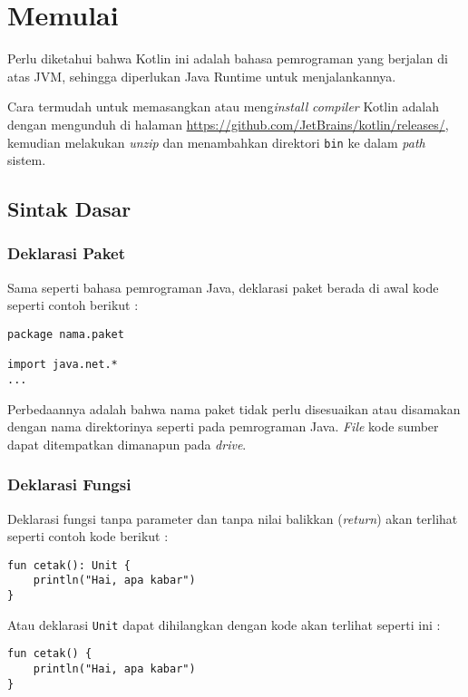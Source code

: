 \chapter{Memulai} 

Perlu diketahui bahwa Kotlin ini adalah bahasa pemrograman yang berjalan di atas JVM, sehingga diperlukan Java Runtime untuk menjalankannya.

Cara termudah untuk memasangkan atau meng\textit{install} \textit{compiler} Kotlin adalah dengan mengunduh di halaman \url{https://github.com/JetBrains/kotlin/releases/}, kemudian melakukan \textit{unzip} dan menambahkan direktori \texttt{bin} ke dalam \textit{path} sistem.

\section{Sintak Dasar}

\subsection{Deklarasi Paket}

Sama seperti bahasa pemrograman Java, deklarasi paket berada di awal kode seperti contoh berikut :

\begin{lstlisting}
package nama.paket

import java.net.*
...
\end{lstlisting}

Perbedaannya adalah bahwa nama paket tidak perlu disesuaikan atau disamakan dengan nama direktorinya seperti pada pemrograman Java. \textit{File} kode sumber dapat ditempatkan dimanapun pada \textit{drive}.

\subsection{Deklarasi Fungsi}

Deklarasi fungsi tanpa parameter dan tanpa nilai balikkan (\textit{return}) akan terlihat seperti contoh kode berikut :

\begin{lstlisting}
fun cetak(): Unit {
	println("Hai, apa kabar")
}
\end{lstlisting}

Atau deklarasi \texttt{Unit} dapat dihilangkan dengan kode akan terlihat seperti ini :

\begin{lstlisting}
fun cetak() {
	println("Hai, apa kabar")
}
\end{lstlisting}

